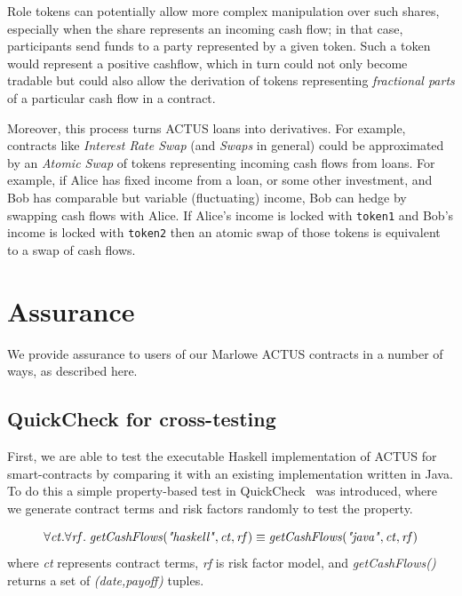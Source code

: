 \documentclass[runningheads]{llncs}
\newcommand{\ident}[1]{\mbox{\emph{#1}}}
\begin{document}
Role tokens can potentially allow more complex manipulation over such shares,
especially when the share represents an incoming cash flow; in that case, participants
send funds to a party represented by a given token. Such a token
would represent a positive cashflow, which in turn could not only become
tradable but could also allow the derivation of tokens representing \emph{fractional parts}
of a particular cash flow in a contract.

Moreover, this process turns ACTUS loans into derivatives. For example, contracts
like \emph{Interest Rate Swap} (and \emph{Swaps} in general) could be approximated
by an \emph{Atomic Swap} of tokens representing incoming cash flows from
loans. 
For example, if Alice has fixed income from a loan, or some other
investment, and Bob has comparable but variable (fluctuating) income,
Bob can hedge by swapping cash flows with Alice. If Alice's income
is locked with \texttt{token1} and Bob's income is locked with \texttt{token2} then an
atomic swap of those tokens is equivalent to a swap of cash flows.

\section{Assurance}
\label{assurance}

We provide assurance to users of our Marlowe ACTUS contracts in a number of ways, as described here. 

\subsection{QuickCheck for cross-testing}

First, we are able to test the executable Haskell implementation
of ACTUS for smart-contracts by comparing it with an existing implementation written in Java. To do this  
a simple property-based test in QuickCheck~\cite{qc} was introduced, where we generate contract terms and risk factors randomly to test the property.

\newcommand{\rf}{\ident{rf}}
\newcommand{\ct}{\ident{ct}}
\smallskip
\noindent 
\begin{equation*}
\forall \ct.\forall \rf. \; \ident{getCashFlows}(\ident{"haskell"},\ct,\rf)\equiv \ident{getCashFlows}(\ident{"java"},\ct,\rf)
\end{equation*}
\noindent
where \emph{ct} represents contract terms, \emph{rf} is risk factor model, and
\emph{getCashFlows()} returns a set of \emph{(date,payoff)} tuples.
\end{document}

